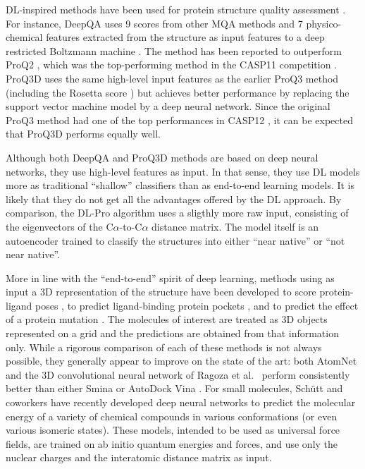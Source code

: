 \documentclass{bioinfo}
\begin{document}
DL-inspired methods have been used for protein structure quality
assessment \citep{nguyen2014dlpro, cao2016deepqa,
uziela2017proq3d}. For instance, DeepQA \citep{cao2016deepqa} uses 9
scores from other MQA methods and 7 physico-chemical features
extracted from the structure as input features to a deep restricted
Boltzmann machine \citep{hinton2006fast}. The method has been
reported to outperform ProQ2 \citep{ray2012proq2},
which was the top-performing method in the CASP11
competition \citep{kryshtafovych2015}.  ProQ3D \citep{uziela2017proq3d}
uses the same high-level input features as the earlier ProQ3
method \citep{uziela2016proq3} (including the
Rosetta score \citep{leaverfay2011rosetta}) but achieves better
performance by replacing the support vector machine model by a deep
neural network. Since the original ProQ3 method had one of the top
performances in CASP12 \citep{elofsson2017qacasp12}, it can be expected
that ProQ3D performs equally well.

Although both DeepQA and ProQ3D
methods are based on deep neural networks, they use high-level
features as input. In that sense, they use DL models more as
traditional ``shallow'' classifiers than as end-to-end learning
models. It is likely that they do not get all the advantages offered
by the DL approach.
By comparison, the DL-Pro algorithm \citep{nguyen2014dlpro} uses a
sligthly more raw input, consisting of the eigenvectors of the
C$\alpha$-to-C$\alpha$ distance matrix. The model itself is an
autoencoder \citep{hinton2006reducing} trained to classify the
structures into either ``near native'' or ``not near native''.

More in line with the ``end-to-end'' spirit of deep learning, methods
using as input a 3D representation of the structure have been
developed to score protein-ligand poses \citep{wallach2015atomnet,
ragoza2017protein}, to predict ligand-binding protein
pockets \citep{jimenez2017deepsite}, and to predict the effect of a
protein mutation \citep{torng2017}. The molecules of interest are
treated as 3D objects represented on a grid and the predictions are
obtained from that information only. While a rigorous comparison of
each of these methods is not always possible, they generally appear to
improve on the state of the art: both
AtomNet \citep{wallach2015atomnet} and the 3D convolutional neural
network of Ragoza et al.\ \citep{ragoza2017protein} perform
consistently better than either Smina \citep{koes2013smina} or AutoDock
Vina \citep{trott2009vina}.
For small molecules, Sch\"{u}tt and coworkers \cite{schutt2017quantum,
schutt2017moleculenet} have recently developed deep neural networks to predict
the molecular energy of a variety of chemical compounds in various
conformations (or even various isomeric states). These models,
intended to be used as universal force fields, are trained on ab
initio quantum energies and forces, and use only the nuclear charges and the
interatomic distance matrix as input.
\end{document}
